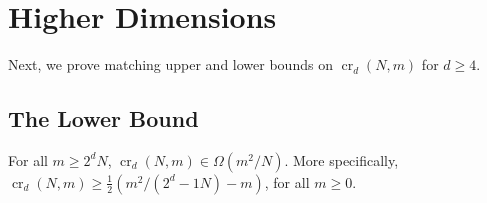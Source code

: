 \documentclass[12pt]{article}
\newcommand{\n}{N}
\DeclareMathOperator{\crs}{cr}
\begin{document}
\section{Higher Dimensions}

Next, we prove matching upper and lower bounds on $\crs_d(\n,m)$ for
$d\ge 4$.

\subsection{The Lower Bound}

\begin{thm}
  For all $m\ge 2^d\n$, $\crs_d(\n,m)\in\Omega(m^2/\n)$.  More specifically,
  $\crs_d(\n,m)\ge \frac{1}{2}(m^2/(2^d-1\n) - m)$, for all $m\ge 0$.
\end{thm}
\end{document}
